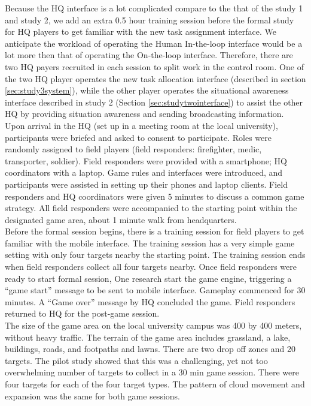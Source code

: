 Because the HQ interface is a lot complicated compare to the that of the study 1 and study 2, we add an extra 0.5 hour training session before the formal study for HQ players to get familiar with the new task assignment interface. We anticipate the workload of operating the Human In-the-loop interface would be a lot more then that of operating the On-the-loop interface. Therefore, there are two HQ payers recruited in each session to split work in the control room. One of the two HQ player operates the new task allocation interface (described in section \ref{sec:study3system}), while the other player operates the situational awareness interface described in study 2 (Section \ref{sec:studytwointerface}) to assist the other HQ by providing situation awareness and sending broadcasting information. \\

Upon arrival in the HQ (set up in a meeting room at the local university), participants were briefed and asked to consent to participate. Roles were randomly assigned to field players (field responders: firefighter, medic, transporter, soldier). Field responders were provided with a smartphone; HQ coordinators with a laptop. Game rules and interfaces were introduced, and participants were assisted in setting up their phones and laptop clients. Field responders and HQ coordinators were given 5 minutes to discuss a common game strategy. All field responders were accompanied to the starting point within the designated game area, about 1 minute walk from headquarters.\\

Before the formal session begins, there is a training session for field players to get familiar with the mobile interface. The training session has a very simple game setting with only four targets nearby the starting point. The training session ends when field responders collect all four targets nearby. Once field responders were ready to start formal session, One research start the game engine, triggering a ``game start'' message to be sent to mobile interface. Gameplay commenced for 30 minutes. A ``Game over'' message by HQ concluded the game. Field responders returned to HQ for the post-game session.\\

The size of the game area on the local university campus was 400 by 400 meters, without heavy traffic. The terrain of the game area includes grassland, a lake, buildings, roads, and footpaths and lawns. There are two drop off zones and 20 targets. The pilot study showed that this was a challenging, yet not too overwhelming number of targets to collect in a 30 min game session. There were four targets for each of the four target types. The pattern of cloud movement and expansion was the same for both game sessions.\\

